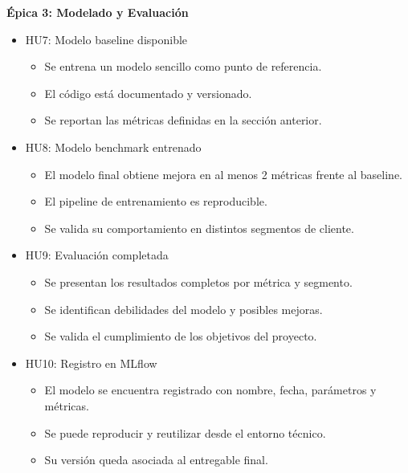 \documentclass[
11pt, %
]{charter}
\begin{document}
\textbf{\'Epica 3: Modelado y Evaluación}
\begin{itemize}
  \item HU7: Modelo baseline disponible
  \begin{itemize}
    \item Se entrena un modelo sencillo como punto de referencia.
    \item El código está documentado y versionado.
    \item Se reportan las métricas definidas en la sección anterior.
  \end{itemize}
  \item HU8: Modelo benchmark entrenado
  \begin{itemize}
    \item El modelo final obtiene mejora en al menos 2 métricas frente al baseline.
    \item El pipeline de entrenamiento es reproducible.
    \item Se valida su comportamiento en distintos segmentos de cliente.
  \end{itemize}
  \item HU9: Evaluación completada
  \begin{itemize}
    \item Se presentan los resultados completos por métrica y segmento.
    \item Se identifican debilidades del modelo y posibles mejoras.
    \item Se valida el cumplimiento de los objetivos del proyecto.
  \end{itemize}
  \item HU10: Registro en MLflow
  \begin{itemize}
    \item El modelo se encuentra registrado con nombre, fecha, parámetros y métricas.
    \item Se puede reproducir y reutilizar desde el entorno técnico.
    \item Su versión queda asociada al entregable final.
  \end{itemize}
\end{itemize}
\end{document}
